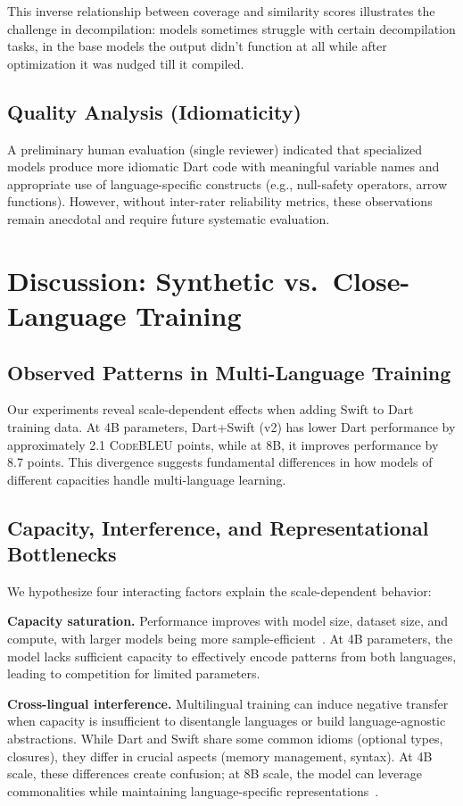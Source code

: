 \documentclass[10pt,conference]{IEEEtran}
\newcommand{\codebleu}{\textsc{CodeBLEU}\xspace}
\begin{document}
This inverse relationship between coverage and similarity scores illustrates the challenge in decompilation: models sometimes struggle with certain decompilation tasks, in the base models the output didn't function at all while after optimization it was nudged till it compiled.

\subsection{Quality Analysis (Idiomaticity)}
A preliminary human evaluation (single reviewer) indicated that specialized models produce more idiomatic Dart code with meaningful variable names and appropriate use of language-specific constructs (e.g., null-safety operators, arrow functions). However, without inter-rater reliability metrics, these observations remain anecdotal and require future systematic evaluation.

\section{Discussion: Synthetic vs.\ Close-Language Training}

\subsection{Observed Patterns in Multi-Language Training}
Our experiments reveal scale-dependent effects when adding Swift to Dart training data. At 4B parameters, Dart+Swift (v2) has lower Dart performance by approximately 2.1 \codebleu{} points, while at 8B, it improves performance by 8.7 points. This divergence suggests fundamental differences in how models of different capacities handle multi-language learning.

\subsection{Capacity, Interference, and Representational Bottlenecks}
We hypothesize four interacting factors explain the scale-dependent behavior:

\textbf{Capacity saturation.} Performance improves with model size, dataset size, and compute, with larger models being more sample-efficient~\cite{scalinglaws2020}. At 4B parameters, the model lacks sufficient capacity to effectively encode patterns from both languages, leading to competition for limited parameters.

\textbf{Cross-lingual interference.} Multilingual training can induce negative transfer when capacity is insufficient to disentangle languages or build language-agnostic abstractions. While Dart and Swift share some common idioms (optional types, closures), they differ in crucial aspects (memory management, syntax). At 4B scale, these differences create confusion; at 8B scale, the model can leverage commonalities while maintaining language-specific representations~\cite{muennighoff2023}.
\end{document}
